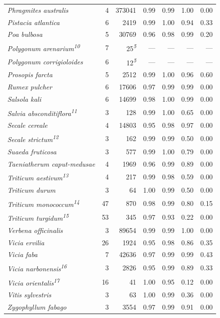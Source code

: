 \documentclass[
  authoryear,
  preprint]{elsarticle}
\begin{document}
\begin{longtable}{@{\extracolsep{\fill}}lrrrrrr}
{\itshape Phragmites australis} & 4 & 373041 & 0.99 & 0.99 & 1.00 & 0.00 \\ 
{\itshape Pistacia atlantica} & 6 & 2419 & 0.99 & 1.00 & 0.94 & 0.33 \\ 
{\itshape Poa bulbosa} & 5 & 30769 & 0.96 & 0.98 & 0.99 & 0.20 \\ 
{\itshape Polygonum arenarium}\textsuperscript{\textit{10}} & 7 & 25\textsuperscript{\textit{5}} & — & — & — & — \\ 
{\itshape Polygonum corrigioloides} & 6 & 12\textsuperscript{\textit{5}} & — & — & — & — \\ 
{\itshape Prosopis farcta} & 5 & 2512 & 0.99 & 1.00 & 0.96 & 0.60 \\ 
{\itshape Rumex pulcher} & 6 & 17606 & 0.97 & 0.99 & 0.99 & 0.00 \\ 
{\itshape Salsola kali} & 6 & 14699 & 0.98 & 1.00 & 0.99 & 0.00 \\ 
{\itshape Salvia absconditiflora}\textsuperscript{\textit{11}} & 3 & 128 & 0.99 & 1.00 & 0.65 & 0.00 \\ 
{\itshape Secale cereale} & 4 & 14803 & 0.95 & 0.98 & 0.97 & 0.00 \\ 
{\itshape Secale strictum}\textsuperscript{\textit{12}} & 3 & 162 & 0.99 & 0.99 & 0.50 & 0.00 \\ 
{\itshape Suaeda fruticosa} & 3 & 577 & 0.99 & 1.00 & 0.79 & 0.00 \\ 
{\itshape Taeniatherum caput-medusae} & 4 & 1969 & 0.96 & 0.99 & 0.89 & 0.00 \\ 
{\itshape Triticum aestivum}\textsuperscript{\textit{13}} & 4 & 217 & 0.99 & 0.98 & 0.59 & 0.00 \\ 
{\itshape Triticum durum} & 3 & 64 & 1.00 & 0.99 & 0.50 & 0.00 \\ 
{\itshape Triticum monococcum}\textsuperscript{\textit{14}} & 47 & 870 & 0.98 & 0.99 & 0.80 & 0.15 \\ 
{\itshape Triticum turgidum}\textsuperscript{\textit{15}} & 53 & 345 & 0.97 & 0.93 & 0.22 & 0.00 \\ 
{\itshape Verbena officinalis} & 3 & 89654 & 0.99 & 0.99 & 1.00 & 0.00 \\ 
{\itshape Vicia ervilia} & 26 & 1924 & 0.95 & 0.98 & 0.86 & 0.35 \\ 
{\itshape Vicia faba} & 7 & 42636 & 0.97 & 0.99 & 0.99 & 0.43 \\ 
{\itshape Vicia narbonensis}\textsuperscript{\textit{16}} & 3 & 2826 & 0.95 & 0.99 & 0.89 & 0.33 \\ 
{\itshape Vicia orientalis}\textsuperscript{\textit{17}} & 16 & 41 & 1.00 & 0.95 & 0.12 & 0.00 \\ 
{\itshape Vitis sylvestris} & 3 & 63 & 1.00 & 0.99 & 0.36 & 0.00 \\ 
{\itshape Zygophyllum fabago} & 3 & 3554 & 0.97 & 0.99 & 0.91 & 0.00 \\ 
\bottomrule

\end{longtable}
\end{document}
